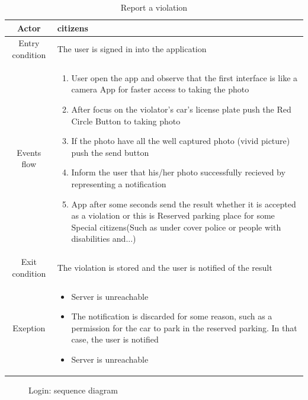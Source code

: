 \documentclass{article}
\begin{document}
		\begin{table} [H]
		\begin{center}
		\caption{Report a violation}
		\begin{tabular}{|c|p{8cm}|}
			\hline
			Actor			&	citizens\\
			\hline
			Entry condition	&	The user is signed in into the application\\
			\hline
			Events flow		&	\begin{enumerate}[noitemsep,topsep=0pt]
									\item User open the app and observe that the first
									 interface is like a camera App for faster access to
									  taking the photo			
									\item After focus on the violator's car's license
									 plate push the Red Circle Button to taking photo
									\item If the photo have all the well captured photo 
									(vivid picture) push the send button
									\item Inform the user that his/her photo successfully
									 recieved by representing a notification
									\item App after some seconds send the result whether it 
									is accepted as a violation or this is Reserved parking
									 place for some Special citizens(Such as under cover 
									 police or people with disabilities and...)
								\end{enumerate}\\
			\hline
			Exit condition	&	The violation is stored and the user is notified 
								of the result\\
			\hline
			Exeption			&	\begin{itemize}[noitemsep,topsep=0pt]
									\item Server is unreachable
									\item The notification is discarded for some reason,
									 such as a permission for the car to park in the 
									 reserved parking. In that case, the user is notified
									\item Server is unreachable
								\end{itemize}\\
			\hline
		\end{tabular}
		\end{center}
		\end{table} 
	
	\begin{figure}[H]
				
		\centering
		\def\svgwidth{\columnwidth}
		
		\caption{Login: sequence diagram}
		
	\end{figure}
	
\end{document}
